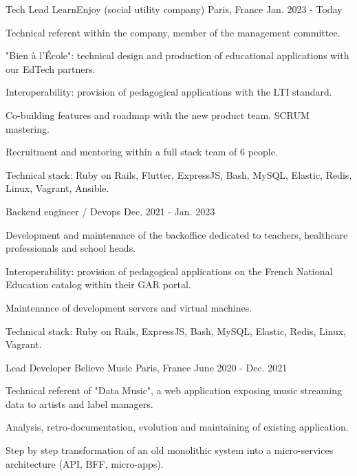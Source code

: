 \begin{cventries}
  \cventry
    {Tech Lead}
    {LearnEnjoy (social utility company)}
    {Paris, France}
    {Jan. 2023 - Today}
    {
      \begin{cvitems}
        \item {Technical referent within the company, member of the management committee.}
        \item {"Bien à l'École": technical design and production of educational applications with our EdTech partners.}
        \item {Interoperability: provision of pedagogical applications with the LTI standard.}
        \item {Co-building features and roadmap with the new product team. SCRUM mastering.}
        \item {Recruitment and mentoring within a full stack team of 6 people.}
        \item {Technical stack: Ruby on Rails, Flutter, ExpressJS, Bash, MySQL, Elastic, Redis, Linux, Vagrant, Ansible.}
      \end{cvitems}
      \vspace{-2.0mm}
    }
  \cventry
    {Backend engineer / Devops}
    {}
    {}
    {Dec. 2021 - Jan. 2023}
    {
      \begin{cvitems}
        \item {Development and maintenance of the backoffice dedicated to teachers, healthcare professionals and school heads.}
        \item {Interoperability: provision of pedagogical applications on the French National Education catalog within their GAR portal.}
        \item {Maintenance of development servers and virtual machines.}
        \item {Technical stack: Ruby on Rails, ExpressJS, Bash, MySQL, Elastic, Redis, Linux, Vagrant.}
      \end{cvitems}
    }
  \cventry
    {Lead Developer}
    {Believe Music}
    {Paris, France}
    {June 2020 - Dec. 2021}
    {
      \begin{cvitems}
        \item {Technical referent of "Data Music", a web application exposing music streaming data to artists and label managers.}
        \item {Analysis, retro-documentation, evolution and maintaining of existing application.}
        \item {Step by step transformation of an old monolithic system into a micro-services architecture (API, BFF, micro-apps).}

\end{cvitems}}
\end{cventries}
